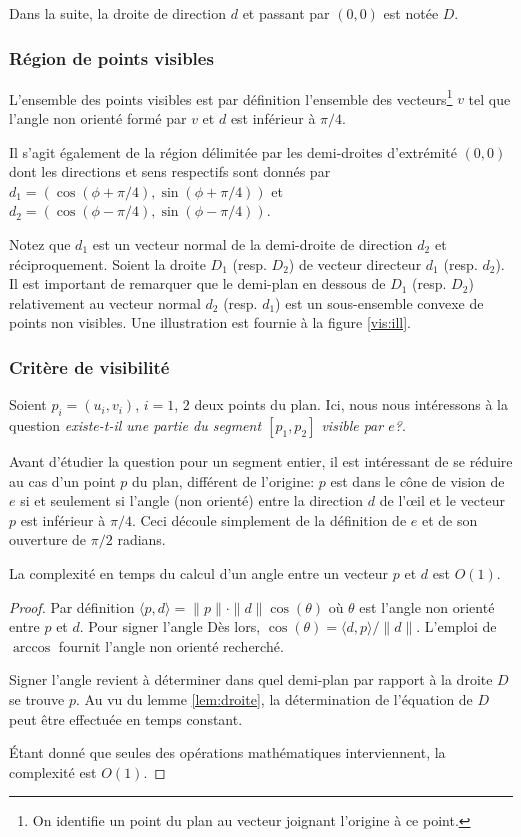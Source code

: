 Dans la suite, la droite de direction $d$ et passant par $(0, 0)$ est notée $D$.

\subsubsection{Région de points visibles}
L'ensemble des points visibles est par définition l'ensemble
des vecteurs\footnote{On identifie un point du plan au vecteur
  joignant l'origine à ce point.} $v$ tel que l'angle non orienté formé
par $v$ et $d$ est inférieur à $\pi/4$.

Il s'agit également de la région délimitée par les demi-droites d'extrémité
$(0, 0)$ dont les directions et sens respectifs sont donnés par
$d_1 = (\cos(\phi + \pi/4), \sin(\phi + \pi/4))$ et
$d_2 = (\cos(\phi - \pi/4), \sin(\phi - \pi/4))$.

Notez que $d_1$ est un vecteur
normal de la demi-droite de direction $d_2$ et réciproquement.
Soient la droite $D_1$ (resp. $D_2$) de vecteur directeur $d_1$
(resp. $d_2$). Il est important de remarquer
que le demi-plan en dessous de $D_1$ (resp. $D_2$) relativement au vecteur
normal $d_2$ (resp. $d_1$) est un sous-ensemble convexe de points non visibles.
Une illustration est fournie à la figure \ref{vis:ill}.


\subsubsection{Critère de visibilité}
Soient $p_i=(u_i, v_i)$, $i = 1$, $2$ deux points du plan. Ici, nous nous
intéressons à la question \og\emph{existe-t-il une partie du segment $[p_1, p_2]$
  visible par $e$?}\fg.

Avant d'étudier la question pour un segment entier, il est intéressant de
se réduire au cas d'un point $p$ du plan, différent de l'origine:
$p$ est dans le cône de vision de $e$
si et seulement si l'angle (non orienté) entre la direction
$d$ de l'\oe{}il et le vecteur $p$
est inférieur
à $\pi/4$. Ceci découle simplement de la définition de $e$ et de son ouverture
de $\pi/2$ radians.

\begin{lem}
  La complexité en temps du calcul d'un angle entre un vecteur $p$ et $d$ est
  $O(1)$.
\end{lem}
\begin{proof}
  Par définition $\langle p, d\rangle = \|p\|\cdot \|d\| \cos(\theta)$ où $\theta$ est
  l'angle non orienté entre $p$ et $d$. Pour signer l'angle
  Dès lors, $\cos(\theta) = \langle d, p\rangle/\|d\|$. L'emploi de $\arccos$
  fournit l'angle non orienté recherché.

  Signer l'angle revient à déterminer
  dans quel demi-plan par rapport à la droite $D$ se trouve $p$.
  Au vu du lemme \ref{lem:droite}, la détermination de l'équation de $D$
  peut être effectuée en temps constant.

  \'Etant donné que seules des opérations mathématiques interviennent,
  la complexité est $O(1)$.
\end{proof}


